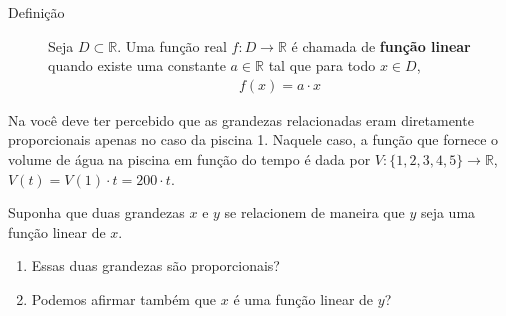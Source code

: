\begin{description}

\item [Definição] 

Seja \(D\subset \mathbb{R}\). Uma função real \(f:D\to\mathbb{R}\) é chamada de \textbf{função linear} quando existe uma constante \(a\in \mathbb{R}\) tal que para todo \(x\in D\),
\begin{equation*}
\begin{split}f(x) = a\cdot x\end{split}
\end{equation*}\end{description}

Na  você deve ter percebido que as grandezas relacionadas eram diretamente proporcionais apenas no caso da piscina 1. Naquele caso, a função que fornece o volume de água na piscina em função do tempo é dada por \(V:\{1,2,3,4,5\}\to \mathbb{R}\),   \(V(t)=V(1)\cdot t=200\cdot t\).

\begin{reflection}



Suponha que duas grandezas \(x\) e \(y\) se relacionem de maneira que \(y\) seja uma função linear de \(x\).
\begin{enumerate}
\item {} 
Essas duas grandezas são proporcionais?

\item {} 
Podemos afirmar também que \(x\) é uma função linear de \(y\)?

\end{enumerate}
\end{reflection}


